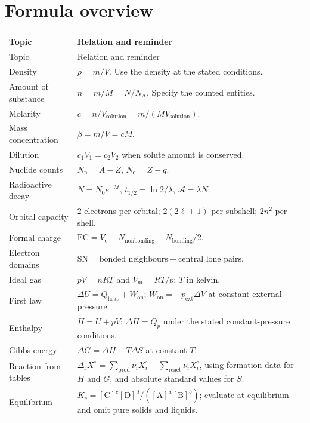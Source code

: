 \documentclass[a4paper,10pt]{article}
\begin{document}
\section{Formula overview}
\label{app:formulas}
\begin{longtable}{@{}P{43mm}P{112mm}@{}}
\toprule
Topic & Relation and reminder \\
\midrule
\endfirsthead
\toprule
Topic & Relation and reminder \\
\midrule
\endhead
\bottomrule
\endfoot
Density & $\rho=m/V$. Use the density at the stated conditions. \\
Amount of substance & $n=m/M=N/N_{\mathrm A}$. Specify the counted entities. \\
Molarity & $c=n/V_{\mathrm{solution}}=m/(MV_{\mathrm{solution}})$. \\
Mass concentration & $\beta=m/V=cM$. \\
Dilution & $c_1V_1=c_2V_2$ when solute amount is conserved. \\
Nuclide counts & $N_{\mathrm n}=A-Z$, $N_{\mathrm e}=Z-q$. \\
Radioactive decay & $N=N_0e^{-\lambda t}$,
$t_{1/2}=\ln2/\lambda$, $\mathcal A=\lambda N$. \\
Orbital capacity & $2$ electrons per orbital; $2(2\ell+1)$ per subshell;
$2n^2$ per shell. \\
Formal charge & $\mathrm{FC}=V_{\mathrm e}-N_{\mathrm{nonbonding}}-N_{\mathrm{bonding}}/2$. \\
Electron domains & $\mathrm{SN}=\text{bonded neighbours}+\text{central lone pairs}$. \\
Ideal gas & $pV=nRT$ and $V_{\mathrm m}=RT/p$; $T$ in kelvin. \\
First law & $\Delta U=Q_{\mathrm{heat}}+W_{\mathrm{on}}$;
$W_{\mathrm{on}}=-p_{\mathrm{ext}}\Delta V$ at constant external pressure. \\
Enthalpy & $H=U+pV$; $\Delta H=Q_p$ under the stated constant-pressure conditions. \\
Gibbs energy & $\Delta G=\Delta H-T\Delta S$ at constant $T$. \\
Reaction from tables & $\Delta_{\mathrm r}X^\circ=
\sum_{\mathrm{prod}}\nu_iX_i^\circ-\sum_{\mathrm{react}}\nu_iX_i^\circ$,
using formation data for $H$ and $G$, and absolute standard values for $S$. \\
Equilibrium & $K_c=[\mathrm C]^c[\mathrm D]^d/([\mathrm A]^a[\mathrm B]^b)$;
evaluate at equilibrium and omit pure solids and liquids. \\

\end{longtable}
\end{document}
